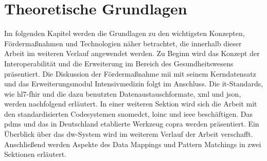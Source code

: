 \chapter{Theoretische Grundlagen} \label{ch:theobasis}

Im folgenden Kapitel werden die Grundlagen zu den wichtigsten Konzepten, Fördermaßnahmen und Technologien näher betrachtet, die innerhalb dieser Arbeit im weiteren Verlauf angewendet werden. Zu Beginn wird das Konzept der Interoperabilität und die Erweiterung im Bereich des Gesundheitswesens präsentiert. Die Diskussion der Fördermaßnahme \glqq\ac{mii}\grqq{} mit seinem Kerndatensatz und das Erweiterungsmodul Intensivmedizin folgt im Anschluss. Die \ac{it}-Standards, wie \ac{hl7}-\ac{fhir} und die dazu benutzten Datenaustauschformate, \ac{xml} und \ac{json}, werden nachfolgend erläutert. In einer weiteren Sektion wird sich die Arbeit mit den standardisierten Codesystemen \ac{snomedct}, \ac{loinc} und \ac{ieee} beschäftigen. Das \ac{pdms} und das in Deutschland etablierte Werkzeug \ac{copra} werden präsentiert. Ein Überblick über das \ac{dw}-System wird im weiterem Verlauf der Arbeit verschafft. Anschließend werden Aspekte des Data Mappings und Pattern Matchings in zwei Sektionen erläutert.